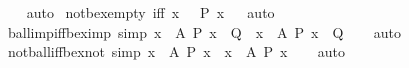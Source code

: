 \begin{isabellebody}
%
\isadelimproof
\ \ %
\endisadelimproof
%
\isatagproof
{}\isamarkupfalse%
\ auto%
\endisatagproof
{\isafoldproof}%
%
\isadelimproof
\isanewline
%
\endisadelimproof
\isanewline
{}\isamarkupfalse%
\ not{\isacharunderscore}{\kern0pt}bex{\isacharunderscore}{\kern0pt}empty\ {\isacharbrackleft}{\kern0pt}iff{\isacharbrackright}{\kern0pt}{\isacharcolon}{\kern0pt}\ {\isachardoublequoteopen}{\isasymnot}{\isacharparenleft}{\kern0pt}{\isasymexists}x\ {\isasymin}\ {\isacharbraceleft}{\kern0pt}{\isacharbraceright}{\kern0pt}{\isachardot}{\kern0pt}\ P\ x{\isacharparenright}{\kern0pt}{\isachardoublequoteclose}%
\isadelimproof
\ %
\endisadelimproof
%
\isatagproof
{}\isamarkupfalse%
\ auto%
\endisatagproof
{\isafoldproof}%
%
\isadelimproof
%
\endisadelimproof
\isanewline
\isanewline
{}\isamarkupfalse%
\ ball{\isacharunderscore}{\kern0pt}imp{\isacharunderscore}{\kern0pt}iff{\isacharunderscore}{\kern0pt}bex{\isacharunderscore}{\kern0pt}imp\ {\isacharbrackleft}{\kern0pt}simp{\isacharbrackright}{\kern0pt}{\isacharcolon}{\kern0pt}\ {\isachardoublequoteopen}{\isacharparenleft}{\kern0pt}{\isasymforall}x\ {\isasymin}\ A{\isachardot}{\kern0pt}\ P\ x\ {\isasymlongrightarrow}\ Q{\isacharparenright}{\kern0pt}\ {\isasymlongleftrightarrow}\ {\isacharparenleft}{\kern0pt}{\isacharparenleft}{\kern0pt}{\isasymexists}x\ {\isasymin}\ A{\isachardot}{\kern0pt}\ P\ x{\isacharparenright}{\kern0pt}\ {\isasymlongrightarrow}\ Q{\isacharparenright}{\kern0pt}{\isachardoublequoteclose}\isanewline
%
\isadelimproof
\ \ %
\endisadelimproof
%
\isatagproof
{}\isamarkupfalse%
\ auto%
\endisatagproof
{\isafoldproof}%
%
\isadelimproof
\isanewline
%
\endisadelimproof
\isanewline
{}\isamarkupfalse%
\ not{\isacharunderscore}{\kern0pt}ball{\isacharunderscore}{\kern0pt}iff{\isacharunderscore}{\kern0pt}bex{\isacharunderscore}{\kern0pt}not\ {\isacharbrackleft}{\kern0pt}simp{\isacharbrackright}{\kern0pt}{\isacharcolon}{\kern0pt}\ {\isachardoublequoteopen}{\isacharparenleft}{\kern0pt}{\isasymnot}{\isacharparenleft}{\kern0pt}{\isasymforall}x\ {\isasymin}\ A{\isachardot}{\kern0pt}\ P\ x{\isacharparenright}{\kern0pt}{\isacharparenright}{\kern0pt}\ {\isasymlongleftrightarrow}\ {\isacharparenleft}{\kern0pt}{\isasymexists}x\ {\isasymin}\ A{\isachardot}{\kern0pt}\ {\isasymnot}P\ x{\isacharparenright}{\kern0pt}{\isachardoublequoteclose}\isanewline
%
\isadelimproof
\ \ %
\endisadelimproof
%
\isatagproof
{}\isamarkupfalse%
\ auto%
\endisatagproof
{\isafoldproof}%
%
\isadelimproof
\isanewline
%
\endisadelimproof
\isanewline
{}\isamarkupfalse%

\end{isabellebody}
